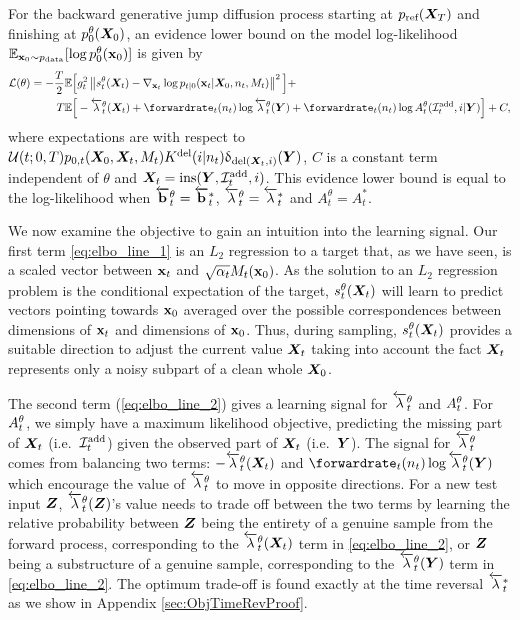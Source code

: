 \begin{proposition}
\label{prop:elbo}
For the backward generative jump diffusion process starting at $p_{\textup{ref}}({\bm{X}}_T)$ and finishing at $ p_0^\theta({\bm{X}}_0)$, an evidence lower bound on the model log-likelihood $ \mathbb{E}_{{\mathbf{x}}_0 \sim p_{\rm{data}}} [ \log p_0^\theta({\mathbf{x}}_0) ]$ is given by
\begin{align}
    \label{eq:elbo_line_1}
    \mathcal{L}(\theta) = -\frac{T}{2} \mathbb{E}\Big[& \diffcoeff_t^2 \norm{s_t^\theta(\mX_t) - \nabla_{\rvx_t} \log p_{t|0}(\rvx_t | \mX_0, n_t, M_t)   }^2 \Big] + \\
    \label{eq:elbo_line_2}
    T \mathbb{E} \Big[& - \backwardrate_{t}^\theta(\mX_t) + \forwardrate_t (n_t) \log \backwardrate_{t}^\theta(\mY) + \forwardrate_t(n_t) \log \autonet_{t}^\theta(\xadd_t, i | \mY) \Big] + C,
\end{align}
where expectations are with respect to $\mathcal{U}(t; 0, T) p_{0,t}({\bm{X}}_0, {\bm{X}}_t, M_t) K^{\textup{del}}(i | n_t) \updelta_{\textup{del}({\bm{X}}_t, i)} ({\bm{Y}})$, $C$ is a constant term independent of $\theta$ and ${\bm{X}}_t = \text{ins}({\bm{Y}}, \mathcal{I}^{\textup{add}}_t, i)$.
This evidence lower bound is equal to the log-likelihood when $\overleftarrow{\mathbf{b}}_t^\theta = \overleftarrow{\mathbf{b}}_t^*$, $\overleftarrow{\lambda}_t^\theta = \overleftarrow{\lambda}_t^*$ and $A_t^\theta = A_t^*$.

\end{proposition}


We now examine the objective to gain an intuition into the learning signal.
Our first term \eqref{eq:elbo_line_1} is an $L_2$ regression to a target that, as we have seen, is a scaled vector between ${\mathbf{x}}_t$ and $\sqrt{\alpha_t}M_t({\mathbf{x}}_0)$.
As the solution to an $L_2$ regression problem is the conditional expectation of the target, $s_t^\theta({\bm{X}}_t)$ will learn to predict vectors pointing towards ${\mathbf{x}}_0$ averaged over the possible correspondences between dimensions of ${\mathbf{x}}_t$ and dimensions of ${\mathbf{x}}_0$.
Thus, during sampling, $s_t^\theta({\bm{X}}_t)$ provides a suitable direction to adjust the current value ${\bm{X}}_t$ taking into account the fact ${\bm{X}}_t$ represents only a noisy subpart of a clean whole ${\bm{X}}_0$.

The second term (\ref{eq:elbo_line_2}) gives a learning signal for $\overleftarrow{\lambda}_{t}^\theta$ and $A_{t}^\theta$.
For $A_{t}^\theta$, we simply have a maximum likelihood objective, predicting the missing part of ${\bm{X}}_t$ (i.e.~$\mathcal{I}^{\textup{add}}_t$) given the observed part of ${\bm{X}}_t$ (i.e.~${\bm{Y}}$).
The signal for $\overleftarrow{\lambda}_{t}^\theta$ comes from balancing two terms: $-\overleftarrow{\lambda}_{t}^\theta({\bm{X}}_t)$ and $\forwardrate_t(n_t) \log \backwardrate_{t}^\theta(\mY)$ which encourage the value of $\overleftarrow{\lambda}_{t}^\theta$ to move in opposite directions. For a new test input ${\bm{Z}}$, $\overleftarrow{\lambda}_{t}^\theta({\bm{Z}})$'s value needs to trade off between the two terms by learning the relative probability between ${\bm{Z}}$ being the entirety of a genuine sample from the forward process, corresponding to the $\overleftarrow{\lambda}_t^\theta({\bm{X}}_t)$ term in \eqref{eq:elbo_line_2}, or ${\bm{Z}}$ being a substructure of a genuine sample, corresponding to the $\overleftarrow{\lambda}_t^\theta({\bm{Y}})$ term in \eqref{eq:elbo_line_2}. The optimum trade-off is found exactly at the time reversal $\overleftarrow{\lambda}_{t}^*$ as we show in Appendix \ref{sec:ObjTimeRevProof}.

